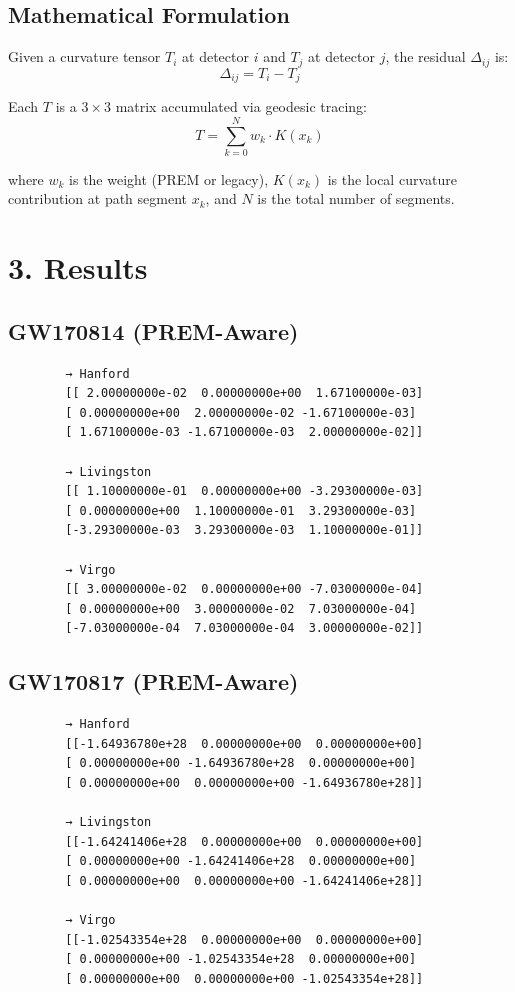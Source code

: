 \documentclass[11pt]{article}
\begin{document}
	\subsection*{Mathematical Formulation}
	Given a curvature tensor $T_i$ at detector $i$ and $T_j$ at detector $j$, the residual $\Delta_{ij}$ is:
	\[
	\Delta_{ij} = T_i - T_j
	\]

	Each $T$ is a $3\times3$ matrix accumulated via geodesic tracing:
	\[
	T = \sum_{k=0}^{N} w_k \cdot K(x_k)
	\]

	where $w_k$ is the weight (PREM or legacy), $K(x_k)$ is the local curvature contribution at path segment $x_k$, and $N$ is the total number of segments.
	
	\section*{3. Results}
	
	\subsection*{GW170814 (PREM-Aware)}
	\begin{verbatim}
		→ Hanford
		[[ 2.00000000e-02  0.00000000e+00  1.67100000e-03]
		[ 0.00000000e+00  2.00000000e-02 -1.67100000e-03]
		[ 1.67100000e-03 -1.67100000e-03  2.00000000e-02]]
		
		→ Livingston
		[[ 1.10000000e-01  0.00000000e+00 -3.29300000e-03]
		[ 0.00000000e+00  1.10000000e-01  3.29300000e-03]
		[-3.29300000e-03  3.29300000e-03  1.10000000e-01]]
		
		→ Virgo
		[[ 3.00000000e-02  0.00000000e+00 -7.03000000e-04]
		[ 0.00000000e+00  3.00000000e-02  7.03000000e-04]
		[-7.03000000e-04  7.03000000e-04  3.00000000e-02]]
	\end{verbatim}
	
	\subsection*{GW170817 (PREM-Aware)}
	\begin{verbatim}
		→ Hanford
		[[-1.64936780e+28  0.00000000e+00  0.00000000e+00]
		[ 0.00000000e+00 -1.64936780e+28  0.00000000e+00]
		[ 0.00000000e+00  0.00000000e+00 -1.64936780e+28]]
		
		→ Livingston
		[[-1.64241406e+28  0.00000000e+00  0.00000000e+00]
		[ 0.00000000e+00 -1.64241406e+28  0.00000000e+00]
		[ 0.00000000e+00  0.00000000e+00 -1.64241406e+28]]
		
		→ Virgo
		[[-1.02543354e+28  0.00000000e+00  0.00000000e+00]
		[ 0.00000000e+00 -1.02543354e+28  0.00000000e+00]
		[ 0.00000000e+00  0.00000000e+00 -1.02543354e+28]]
	\end{verbatim}
	
\end{document}
